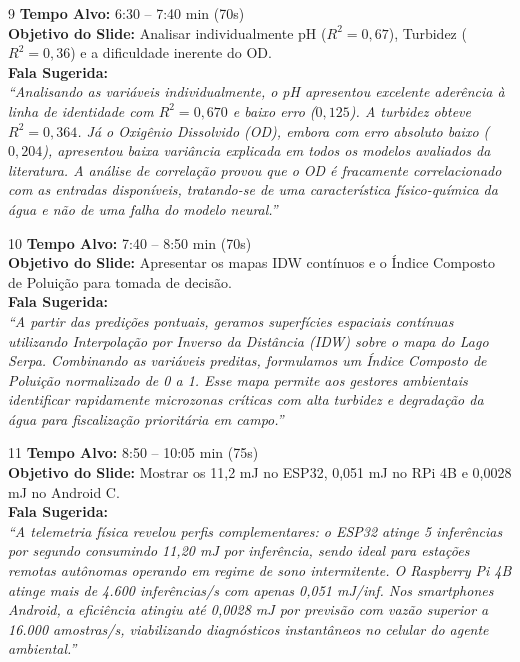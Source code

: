 \documentclass[11pt,a4paper]{article}
\begin{document}
\begin{slidebox}{9}
\textbf{Tempo Alvo:} 6:30 -- 7:40 min (70s)\\[3pt]
\textbf{Objetivo do Slide:} Analisar individualmente pH ($R^2=0{,}67$), Turbidez ($R^2=0{,}36$) e a dificuldade inerente do OD.\\[3pt]
\textbf{Fala Sugerida:}\\
\textit{``Analisando as variáveis individualmente, o pH apresentou excelente aderência à linha de identidade com $R^2 = 0{,}670$ e baixo erro ($0{,}125$). A turbidez obteve $R^2 = 0{,}364$. Já o Oxigênio Dissolvido (OD), embora com erro absoluto baixo ($0{,}204$), apresentou baixa variância explicada em todos os modelos avaliados da literatura. A análise de correlação provou que o OD é fracamente correlacionado com as entradas disponíveis, tratando-se de uma característica físico-química da água e não de uma falha do modelo neural.''}
\end{slidebox}

\begin{slidebox}{10}
\textbf{Tempo Alvo:} 7:40 -- 8:50 min (70s)\\[3pt]
\textbf{Objetivo do Slide:} Apresentar os mapas IDW contínuos e o Índice Composto de Poluição para tomada de decisão.\\[3pt]
\textbf{Fala Sugerida:}\\
\textit{``A partir das predições pontuais, geramos superfícies espaciais contínuas utilizando Interpolação por Inverso da Distância (IDW) sobre o mapa do Lago Serpa. Combinando as variáveis preditas, formulamos um Índice Composto de Poluição normalizado de 0 a 1. Esse mapa permite aos gestores ambientais identificar rapidamente microzonas críticas com alta turbidez e degradação da água para fiscalização prioritária em campo.''}
\end{slidebox}

\begin{slidebox}{11}
\textbf{Tempo Alvo:} 8:50 -- 10:05 min (75s)\\[3pt]
\textbf{Objetivo do Slide:} Mostrar os 11,2 mJ no ESP32, 0,051 mJ no RPi 4B e 0,0028 mJ no Android C.\\[3pt]
\textbf{Fala Sugerida:}\\
\textit{``A telemetria física revelou perfis complementares: o ESP32 atinge 5 inferências por segundo consumindo 11,20 mJ por inferência, sendo ideal para estações remotas autônomas operando em regime de sono intermitente. O Raspberry Pi 4B atinge mais de 4.600 inferências/s com apenas 0,051 mJ/inf. Nos smartphones Android, a eficiência atingiu até 0,0028 mJ por previsão com vazão superior a 16.000 amostras/s, viabilizando diagnósticos instantâneos no celular do agente ambiental.''}
\end{slidebox}
\end{document}
